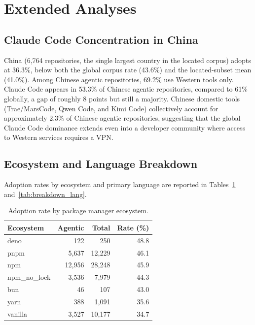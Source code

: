 \section{Extended Analyses}
\label{sec:res:extended}

\subsection{Claude Code Concentration in China}

China (6,764 repositories, the single largest country in the located corpus) adopts at 36.3\%, below both the global corpus rate (43.6\%) and the located-subset mean (41.0\%). Among Chinese agentic repositories, 69.2\% use Western tools only. Claude Code appears in 53.3\% of Chinese agentic repositories, compared to 61\% globally, a gap of roughly 8 points but still a majority. Chinese domestic tools (Trae/MarsCode, Qwen Code, and Kimi Code) collectively account for approximately 2.3\% of Chinese agentic repositories, suggesting that the global Claude Code dominance extends even into a developer community where access to Western services requires a VPN.

\subsection{Ecosystem and Language Breakdown}

Adoption rates by ecosystem and primary language are reported in Tables~\ref{tab:breakdown_eco} and~\ref{tab:breakdown_lang}.

\begin{table}[h]
\centering
\caption{Adoption rate by package manager ecosystem.}
\label{tab:breakdown_eco}
\begin{tabular}{@{}lrrr@{}}
\toprule
Ecosystem & Agentic & Total & Rate (\%) \\
\midrule
deno          &   122 &    250 & 48.8 \\
pnpm          & 5,637 & 12,229 & 46.1 \\
npm           &12,956 & 28,248 & 45.9 \\
npm\_no\_lock & 3,536 &  7,979 & 44.3 \\
bun           &    46 &    107 & 43.0 \\
yarn          &   388 &  1,091 & 35.6 \\
vanilla       & 3,527 & 10,177 & 34.7 \\
\bottomrule
\end{tabular}
\end{table}

